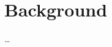 
\chapter{Background} %



\ifpdf
    \graphicspath{{2_background/figures/PNG/}{2_background/figures/PDF/}{2_background/figures/}}
\else
    \graphicspath{{2_background/figures/EPS/}{2_background/figures/}}
\fi


% 

\dots



